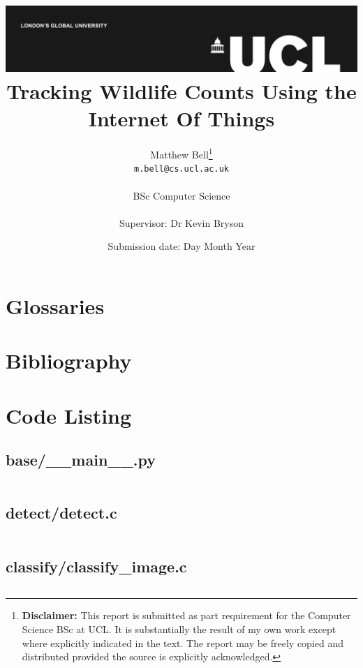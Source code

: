 \documentclass[a4paper]{report}
\title{{\vspace{-14em} \includegraphics[scale=0.4]{ucl_logo.png}}\\
{{\Huge Tracking Wildlife Counts Using the Internet Of Things}}\\
}
\date{Submission date: Day Month Year}
\author{Matthew Bell\thanks{
{\bf Disclaimer:}
This report is submitted as part requirement for the Computer Science BSc at
UCL. It is substantially the result of my own work except where explicitly
indicated in the text.
The report may be freely copied and distributed provided the source is explicitly acknowledged.}
\\ 
\texttt{m.bell@cs.ucl.ac.uk}\\ \\
BSc Computer Science\\ \\
Supervisor: Dr Kevin Bryson}
\begin{document}
 
\onehalfspacing
\maketitle
\begin{abstract}
  
\end{abstract}


\tableofcontents
\setcounter{page}{1}






\nocite{*}

\renewcommand{\chaptername}{Appendix}
\appendix

\chapter{Glossaries}
\printglossaries

\chapter{Bibliography}
\printbibliography[heading=bibempty]

\chapter{Code Listing}

\section{base/\_\_main\_\_.py}
\inputminted[linenos]{python}{../base/__main__.py}

\section{detect/detect.c}
\inputminted[linenos]{C}{../detect/detect.c}

\section{classify/classify\_image.c}
\inputminted[linenos]{python}{../classify/classify_image.py}
\end{document}
